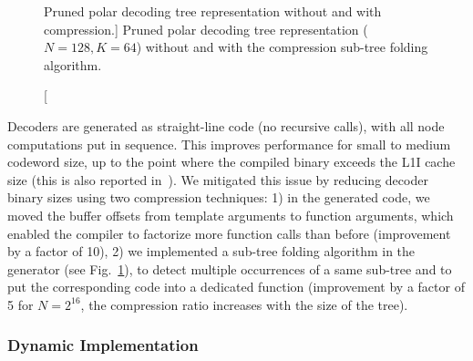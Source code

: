 \begin{figure}[htp]
{
  }

  \caption
    [Pruned polar decoding tree representation without and with compression.]
    {Pruned polar decoding tree representation ($N = 128, K = 64$) without
    and with the compression sub-tree folding algorithm.}
  \label{fig:eval_polar_sc_gen_compression}
\end{figure}

Decoders are generated as straight-line code (no recursive calls), with all node
computations put in sequence. This improves performance for small to medium
codeword size, up to the point where the compiled binary exceeds the L1I cache
size (this is also reported in~\cite{Giard2016b}). We mitigated this issue by
reducing decoder binary sizes using two compression techniques: 1) in the
generated code, we moved the buffer offsets from template arguments to function
arguments, which enabled the compiler to factorize more function calls than
before (improvement by a factor of 10), 2) we implemented a sub-tree folding
algorithm in the generator (see Fig.~\ref{fig:eval_polar_sc_gen_compression}),
to detect multiple occurrences of a same sub-tree and to put the corresponding
code into a dedicated function (improvement by a factor of 5 for $N=2^{16}$, the
compression ratio increases with the size of the tree).

\subsubsection{Dynamic Implementation}

